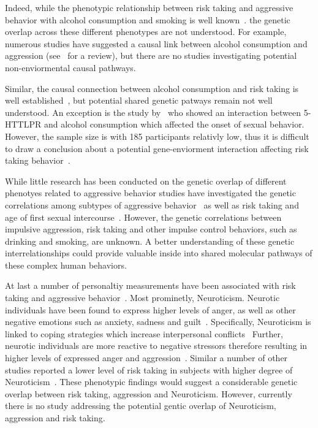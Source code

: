 Indeed, while the phenotypic relationship between risk taking and aggressive behavior with alcohol consumption and smoking is well known~\cite{FRANZKOWIAX1987,Zuckerman2000,Dakwar2011}.
the genetic overlap across these different phenotypes are not understood.
For example, numerous studies have suggested a causal link between alcohol consumption and aggression (see~\citet{Bushman1990} for a review), but there are no studies investigating potential non-enviormental causal pathways.

Similar, the causal connection between alcohol consumption and risk taking is well established~\cite{Lane2004}, but potential shared genetic patways remain not well understood.
An exception is the study by~\cite{Kogan2010} who showed an interaction between 5-HTTLPR and alcohol consumption which affected the onset of sexual behavior. 
However, the sample size is with 185 participants relativly low, thus it is difficult to draw a conclusion about a potential gene-enviorment interaction affecting risk taking behavior~\cite{Rubens2016}.

While little research has been conducted on the genetic overlap of different phenotyes related to aggressive behavior studies have investigated the genetic correlations among subtypes of aggressive behavior~\cite{Tuvblad2011a} as well as risk taking and age of first sexual intercourse~\cite{Day2016}.
However, the genetic correlations between impulsive aggression, risk taking and other impulse control behaviors, such as drinking and smoking, are unknown.
A better understanding of these genetic interrelationships could provide valuable inside into shared molecular pathways of these complex human behaviors.

At last a number of personaltiy measurements have been associated with risk taking and aggressive behavior~\cite{Anderson2002a}.
Most prominetly, Neuroticism.
Neurotic individuals have been found to express higher levels of anger, as well as other negative emotions such as anxiety, sadness and guilt~\cite{Watson1984}.
Specifically, Neuroticism is linked to coping strategies which increase interpersonal conflicts~\cite{Bolger1991,Ode2008}
Further, neurotic individuals are more reactive to negative stressors therefore resulting in higher levels of expressed anger and aggression~\cite{Ode2008}.
Similar a number of other studies reported a lower level of risk taking in subjects with higher degree of Neuroticism~\cite{Lauriola2001,InstituteofMedicine2011,Paulus2003}.
These phenotypic findings would suggest a considerable genetic overlap between risk taking, aggression and Neuroticism.
However, currently there is no study addressing the potential gentic overlap of Neuroticism, aggression and risk taking.

